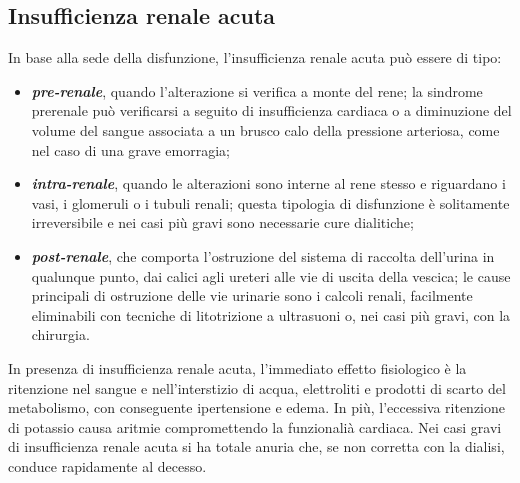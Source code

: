 \subsection{Insufficienza renale acuta \cite{guyton}}
In base alla sede della disfunzione, l'insufficienza renale acuta può essere di tipo:
\begin{itemize}
	\item \textit{\textbf{pre-renale}}, quando l'alterazione si verifica a monte del rene; la sindrome prerenale può verificarsi a seguito di insufficienza cardiaca o a diminuzione del volume del sangue associata a un brusco calo della pressione arteriosa, come nel caso di una grave emorragia;
	\item \textit{\textbf{intra-renale}}, quando le alterazioni sono interne al rene stesso e riguardano i vasi, i glomeruli o i tubuli renali; questa tipologia di disfunzione è solitamente irreversibile e nei casi più gravi sono necessarie cure dialitiche;
	\item \textit{\textbf{post-renale}}, che comporta l'ostruzione del sistema di raccolta dell'urina in qualunque punto, dai calici agli ureteri alle vie di uscita della vescica; le cause principali di ostruzione delle vie urinarie sono i calcoli renali, facilmente eliminabili con tecniche di litotrizione a ultrasuoni o, nei casi più gravi, con la chirurgia.
\end{itemize}
In presenza di insufficienza renale acuta, l'immediato effetto fisiologico è la ritenzione nel sangue e nell'interstizio di acqua, elettroliti e prodotti di scarto del metabolismo, con conseguente ipertensione e edema. In più, l'eccessiva ritenzione di potassio causa aritmie compromettendo la funzionalià cardiaca. Nei casi gravi di insufficienza renale acuta si ha totale anuria che, se non corretta con la dialisi, conduce rapidamente al decesso.

